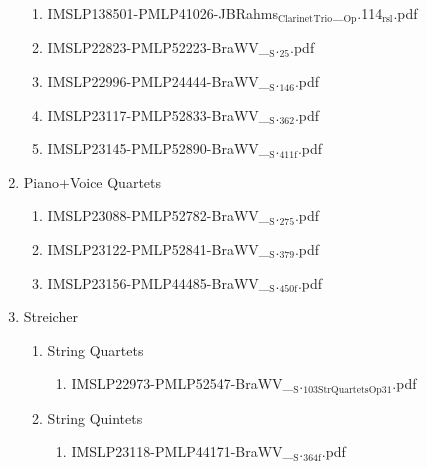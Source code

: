 \documentclass[11pt]{article}
\begin{document}
\begin{enumerate}
\begin{enumerate}
\item IMSLP138501-PMLP41026-JBRahms$_{\text{Clarinet}}$$_{\text{Trio}}$\_$_{\text{Op}}$.114$_{\text{rsl}}$.pdf
\label{sec-1-1-1-1-44-15-10-3}

\item IMSLP22823-PMLP52223-BraWV\_$_{\text{S}}$.$_{\text{25}}$.pdf
\label{sec-1-1-1-1-44-15-10-4}

\item IMSLP22996-PMLP24444-BraWV\_$_{\text{S}}$.$_{\text{146}}$.pdf
\label{sec-1-1-1-1-44-15-10-5}

\item IMSLP23117-PMLP52833-BraWV\_$_{\text{S}}$.$_{\text{362}}$.pdf
\label{sec-1-1-1-1-44-15-10-6}

\item IMSLP23145-PMLP52890-BraWV\_$_{\text{S}}$.$_{\text{411f}}$.pdf
\label{sec-1-1-1-1-44-15-10-7}
\end{enumerate}

\item Piano+Voice Quartets
\label{sec-1-1-1-1-44-15-11}
\begin{enumerate}
\item IMSLP23088-PMLP52782-BraWV\_$_{\text{S}}$.$_{\text{275}}$.pdf
\label{sec-1-1-1-1-44-15-11-1}

\item IMSLP23122-PMLP52841-BraWV\_$_{\text{S}}$.$_{\text{379}}$.pdf
\label{sec-1-1-1-1-44-15-11-2}

\item IMSLP23156-PMLP44485-BraWV\_$_{\text{S}}$.$_{\text{450f}}$.pdf
\label{sec-1-1-1-1-44-15-11-3}
\end{enumerate}

\item Streicher
\label{sec-1-1-1-1-44-15-12}
\begin{enumerate}
\item String Quartets
\label{sec-1-1-1-1-44-15-12-1}
\begin{enumerate}
\item IMSLP22973-PMLP52547-BraWV\_$_{\text{S}}$.$_{\text{103StrQuartetsOp31}}$.pdf
\label{sec-1-1-1-1-44-15-12-1-1}
\end{enumerate}

\item String Quintets
\label{sec-1-1-1-1-44-15-12-2}
\begin{enumerate}
\item IMSLP23118-PMLP44171-BraWV\_$_{\text{S}}$.$_{\text{364f}}$.pdf
\label{sec-1-1-1-1-44-15-12-2-1}


\end{enumerate}
\end{enumerate}
\end{enumerate}
\end{document}
